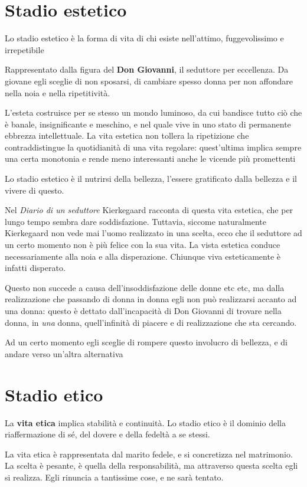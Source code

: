 \documentclass[a4paper, twoside, titlepage]{book}
\begin{document}
\section{Stadio estetico}

Lo stadio estetico è la forma di vita di chi esiste nell'attimo, fuggevolissimo e irrepetibile

Rappresentato dalla figura del \textbf{Don Giovanni}, il seduttore per eccellenza. Da giovane egli sceglie di non sposarsi, di cambiare spesso donna per non affondare nella noia e nella ripetitività.

L'esteta costruisce per se stesso un mondo luminoso, da cui bandisce tutto ciò che è banale, insignificante e meschino, e nel quale vive in uno stato di permanente ebbrezza intellettuale. La vita estetica non tollera la ripetizione che contraddistingue la quotidianità di una vita regolare: quest'ultima implica sempre una certa monotonia e rende meno interessanti anche le vicende più promettenti

Lo stadio estetico è il nutrirsi della bellezza, l'essere gratificato dalla bellezza e il vivere di questo.

Nel \textit{Diario di un seduttore} Kierkegaard racconta di questa vita estetica, che per lungo tempo sembra dare soddisfazione. Tuttavia, siccome naturalmente Kierkegaard non vede mai l'uomo realizzato in una scelta, ecco che il seduttore ad un certo momento non è più felice con la sua vita.
La vista estetica conduce necessariamente alla noia e alla disperazione. Chiunque viva esteticamente è infatti disperato.

Questo non succede a causa dell'insoddisfazione delle donne etc etc, ma dalla realizzazione che passando di donna in donna egli non può realizzarsi accanto ad una donna: questo è dettato dall'incapacità di Don Giovanni di trovare nella donna, in \textit{una} donna, quell'infinità di piacere e di realizzazione che sta cercando.

Ad un certo momento egli sceglie di rompere questo involucro di bellezza, e di andare verso un'altra alternativa

\section{Stadio etico}

La \textbf{vita etica} implica stabilità e continuità. Lo stadio etico è il dominio della riaffermazione di sé, del dovere e della fedeltà a se stessi.

La vita etica è rappresentata dal marito fedele, e si concretizza nel matrimonio.
La scelta è pesante, è quella della responsabilità, ma attraverso questa scelta egli si realizza.
Egli rinuncia a tantissime cose, e ne sarà tentato.
\end{document}
